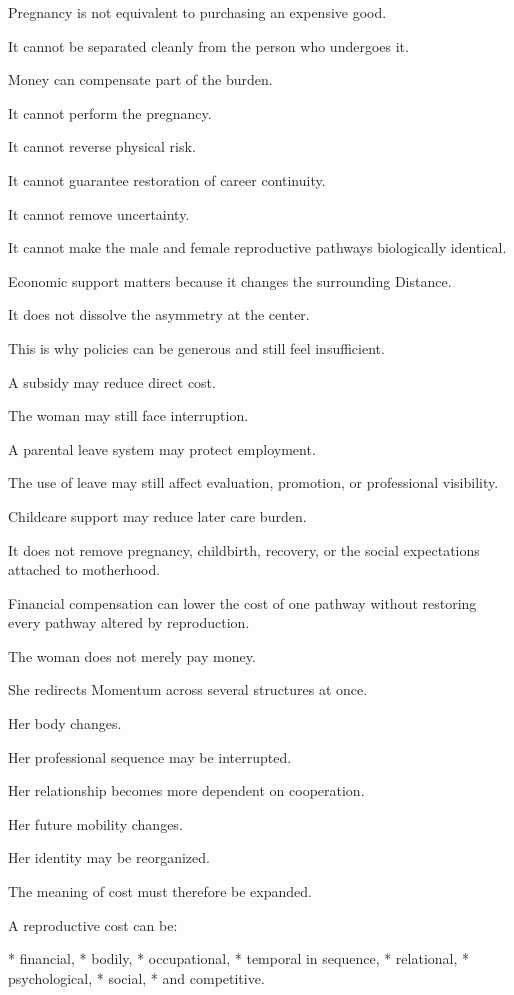 Pregnancy is not equivalent to purchasing an expensive good.

It cannot be separated cleanly from the person who undergoes it.

Money can compensate part of the burden.

It cannot perform the pregnancy.

It cannot reverse physical risk.

It cannot guarantee restoration of career continuity.

It cannot remove uncertainty.

It cannot make the male and female reproductive pathways biologically identical.

Economic support matters because it changes the surrounding Distance.

It does not dissolve the asymmetry at the center.

This is why policies can be generous and still feel insufficient.

A subsidy may reduce direct cost.

The woman may still face interruption.

A parental leave system may protect employment.

The use of leave may still affect evaluation, promotion, or professional visibility.

Childcare support may reduce later care burden.

It does not remove pregnancy, childbirth, recovery, or the social expectations attached to motherhood.

Financial compensation can lower the cost of one pathway without restoring every pathway altered by reproduction.

The woman does not merely pay money.

She redirects Momentum across several structures at once.

Her body changes.

Her professional sequence may be interrupted.

Her relationship becomes more dependent on cooperation.

Her future mobility changes.

Her identity may be reorganized.

The meaning of cost must therefore be expanded.

A reproductive cost can be:

* financial,
* bodily,
* occupational,
* temporal in sequence,
* relational,
* psychological,
* social,
* and competitive.

